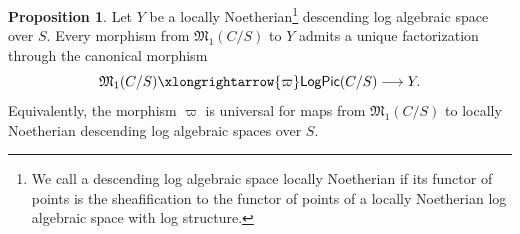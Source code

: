 \documentclass[11pt]{amsart}
\newcommand{\PKHcomment}[1]{{\color{red}PKH: #1}}
\newcommand{\XYHcomment}[1]{\textcolor{brown}{[XYH: #1]}}
\theoremstyle{definition}
\theoremstyle{definition}
\newtheorem{proposition}[theorem]{Proposition}
\newtheorem{remark}[theorem]{Remark}
\begin{document}

\begin{proposition}\label{prop:LogVBtoLogPic}
    Let $Y$ be a locally Noetherian\footnote{We call a descending log algebraic space locally Noetherian if its functor of points is the sheafification to the functor of points of a locally Noetherian log algebraic space with log structure.} descending log algebraic space over $S$. Every morphism from $\mathfrak{M}_1(C/S)$ to $Y$ admits a unique factorization through the canonical morphism $$\mathfrak{M}_1(C/S)\xlongrightarrow{\varpi} \mathsf{LogPic}(C/S)\longrightarrow Y.$$ Equivalently, the morphism $\varpi$ is universal for maps from $\mathfrak{M}_1(C/S)$ to locally Noetherian descending log algebraic spaces over $S$.
\end{proposition}
\end{document}
